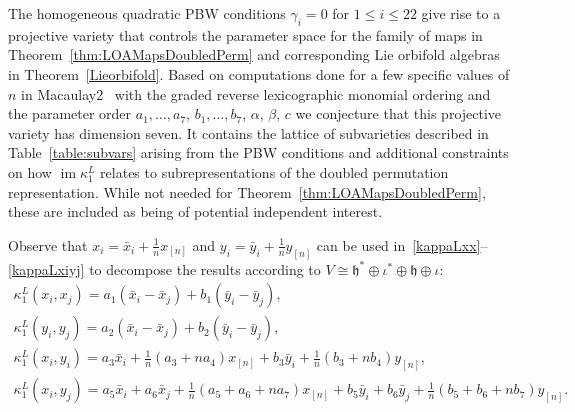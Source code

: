 \documentclass[pdftex]{sigma}
\numberwithin{equation}{section}
\newcommand{\n}[1]{{#1}_{[n]}}
\DeclareMathOperator{\im}{im}
\begin{document}
The homogeneous quadratic PBW conditions $\gamma_i=0$ for $1 \leq i \leq 22$
give rise to a projective variety that controls the parameter space for the
family of maps in Theorem~\ref{thm:LOAMapsDoubledPerm}
and corresponding Lie orbifold algebras in Theorem~\ref{Lieorbifold}.
Based on computations done
for a few specific values of $n$ in Macaulay2~\cite{M2} with the graded reverse
lexicographic monomial ordering and the
parameter order $a_1,\dots,a_7$, $b_1,\dots,b_7$, $\alpha$, $\beta$, $c$
we conjecture that this projective variety has dimen\-sion seven. It contains the
lattice of subvarieties described in Table~\ref{table:subvars} arising from
the PBW conditions and additional constraints on how $\im \kappa^L_1$ relates to
subrepresentations of the doubled permutation representation.
While not needed for Theorem~\ref{thm:LOAMapsDoubledPerm}, these are included as being of potential independent interest.

\begin{Remark}\label{rmk:subrep1}
Observe that
$x_i=\bar{x}_i+\tfrac{1}{n}x_{[n]}$ and $y_i=\bar{y}_i+\tfrac{1}{n}y_{[n]}$
can be used in~\eqref{kappaLxx}--\eqref{kappaLxiyj} to decompose the results
according to $V\cong\mathfrak{h}^* \oplus \iota^* \oplus \mathfrak{h} \oplus \iota$:
\begin{gather}
\kappa^L_1(x_i,x_j)=a_1(\bar{x}_i-\bar{x}_j)+b_1(\bar{y}_i-\bar{y}_j), \\
\kappa^L_1(y_i,y_j)=a_2(\bar{x}_i-\bar{x}_j)+b_2(\bar{y}_i-\bar{y}_j), \\
\kappa^L_1(x_i,y_i)=a_3\bar{x}_i+\frac{1}{n}(a_3+na_4)\n{x}+b_3 \bar{y}_i+\frac{1}{n}(b_3+nb_4)\n{y}, \\
\kappa^L_1(x_i,y_j)=a_5 \bar{x}_i\!+a_6 \bar{x}_j\!+\frac{1}{n}(a_5\!+a_6\!+na_7)\n{x}\!+b_5 \bar{y}_i\!+b_6 \bar{y}_j\!+\frac{1}{n}(b_5\!+b_6\!+nb_7)\n{y}.
\end{gather}
\end{Remark}
\end{document}
